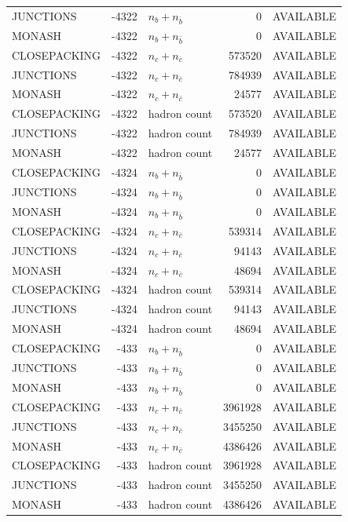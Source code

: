 \begin{landscape}
\begin{longtable}{@{}lrlrl@{}}
JUNCTIONS & -4322 & $n_b+n_{\bar b}$ & \num{0} & AVAILABLE \\
MONASH & -4322 & $n_b+n_{\bar b}$ & \num{0} & AVAILABLE \\
CLOSEPACKING & -4322 & $n_c+n_{\bar c}$ & \num{573520} & AVAILABLE \\
JUNCTIONS & -4322 & $n_c+n_{\bar c}$ & \num{784939} & AVAILABLE \\
MONASH & -4322 & $n_c+n_{\bar c}$ & \num{24577} & AVAILABLE \\
CLOSEPACKING & -4322 & hadron count & \num{573520} & AVAILABLE \\
JUNCTIONS & -4322 & hadron count & \num{784939} & AVAILABLE \\
MONASH & -4322 & hadron count & \num{24577} & AVAILABLE \\
CLOSEPACKING & -4324 & $n_b+n_{\bar b}$ & \num{0} & AVAILABLE \\
JUNCTIONS & -4324 & $n_b+n_{\bar b}$ & \num{0} & AVAILABLE \\
MONASH & -4324 & $n_b+n_{\bar b}$ & \num{0} & AVAILABLE \\
CLOSEPACKING & -4324 & $n_c+n_{\bar c}$ & \num{539314} & AVAILABLE \\
JUNCTIONS & -4324 & $n_c+n_{\bar c}$ & \num{94143} & AVAILABLE \\
MONASH & -4324 & $n_c+n_{\bar c}$ & \num{48694} & AVAILABLE \\
CLOSEPACKING & -4324 & hadron count & \num{539314} & AVAILABLE \\
JUNCTIONS & -4324 & hadron count & \num{94143} & AVAILABLE \\
MONASH & -4324 & hadron count & \num{48694} & AVAILABLE \\
CLOSEPACKING & -433 & $n_b+n_{\bar b}$ & \num{0} & AVAILABLE \\
JUNCTIONS & -433 & $n_b+n_{\bar b}$ & \num{0} & AVAILABLE \\
MONASH & -433 & $n_b+n_{\bar b}$ & \num{0} & AVAILABLE \\
CLOSEPACKING & -433 & $n_c+n_{\bar c}$ & \num{3961928} & AVAILABLE \\
JUNCTIONS & -433 & $n_c+n_{\bar c}$ & \num{3455250} & AVAILABLE \\
MONASH & -433 & $n_c+n_{\bar c}$ & \num{4386426} & AVAILABLE \\
CLOSEPACKING & -433 & hadron count & \num{3961928} & AVAILABLE \\
JUNCTIONS & -433 & hadron count & \num{3455250} & AVAILABLE \\
MONASH & -433 & hadron count & \num{4386426} & AVAILABLE \\

\end{longtable}
\end{landscape}
